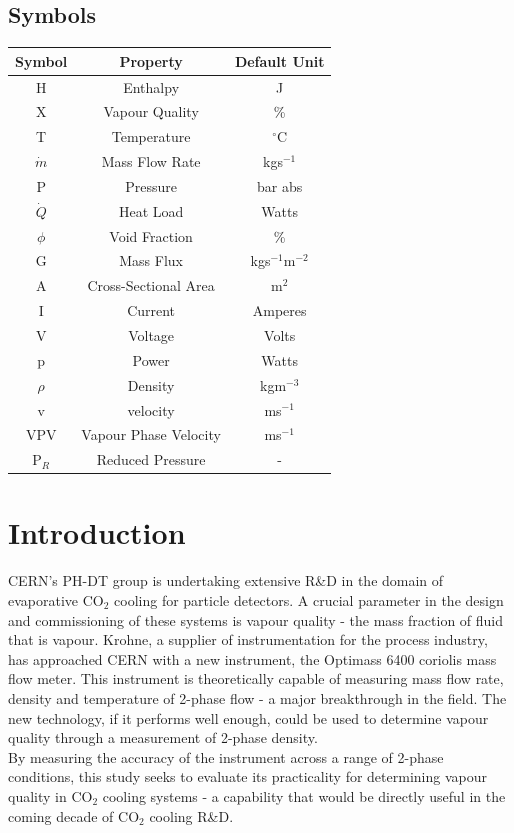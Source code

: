 \documentclass{report}
\begin{document}
\section*{Symbols}
\begin{center}
\begin{tabular}{|c|c|c|}
\hline
\textbf{Symbol} & \textbf{Property} & \textbf{Default Unit} \\\hline
H & Enthalpy & J \\\hline
X & Vapour Quality & \% \\\hline
T & Temperature & $^\circ$C\\\hline
$\dot{m}$ & Mass Flow Rate & kgs$^{-1}$ \\\hline
P & Pressure & bar abs \\\hline
$\dot{Q}$ & Heat Load & Watts \\\hline
$\phi$ & Void Fraction & \% \\\hline
G & Mass Flux & kgs$^{-1}$m$^{-2}$\\\hline
A & Cross-Sectional Area & m$^2$\\\hline
I & Current & Amperes \\\hline
V & Voltage & Volts \\\hline
p & Power & Watts \\\hline
$\rho$ & Density & kgm$^{-3}$\\\hline
v & velocity &  ms$^{-1}$\\\hline
VPV & Vapour Phase Velocity & ms$^{-1}$\\\hline
P$_R$ &Reduced Pressure & -\\\hline
\end{tabular}
\end{center}
\tableofcontents
\chapter{Introduction}
CERN's PH-DT group is undertaking extensive R\&\ignorespaces D in the domain of evaporative CO$_2$ cooling for particle detectors. A crucial parameter in the design and commissioning of these systems is vapour quality - the mass fraction of fluid that is vapour. Krohne, a supplier of instrumentation for the process industry, has approached CERN with a new instrument, the Optimass 6400 coriolis mass flow meter. This instrument is theoretically capable of measuring mass flow rate, density and temperature of 2-phase flow - a major breakthrough  in the field. The new technology, if it performs well enough, could be used to determine vapour quality through a measurement of 2-phase density. \\
By measuring the accuracy of the instrument across a range of 2-phase conditions, this study seeks to evaluate its practicality for determining vapour quality in CO$_2$ cooling systems - a capability that would be directly useful in the coming decade of CO$_2$ cooling R\&\ignorespaces D. 
\FloatBarrier
\end{document}
